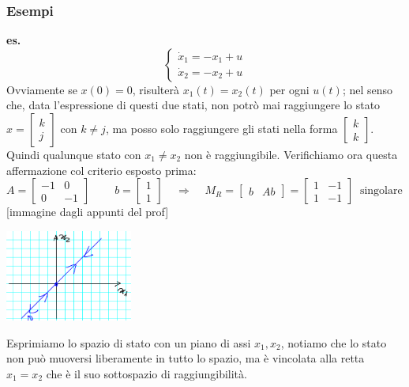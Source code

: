 \subsubsection{Esempi}
\textbf{es.} 
\[
    \begin{cases}
        \dot{x}_1 = -x_1 + u\\
        \dot{x}_2 = -x_2 +u
    \end{cases}
\]
Ovviamente se $x(0) = 0$, risulterà $x_1(t) = x_2(t)$ per ogni $u(t)$; nel senso che, data l'espressione di questi due stati, non potrò mai raggiungere lo stato $x = \left[\begin{matrix}
    k\\j
\end{matrix}\right]$ con $k\neq j$, ma posso solo raggiungere gli stati nella forma $\left[\begin{matrix}
    k\\k
\end{matrix}\right]$.\newline
Quindi qualunque stato con $x_1 \neq x_2$ non è raggiungibile. Verifichiamo ora questa affermazione col criterio esposto prima:
\[
    A = \left[\begin{matrix}
        -1 & 0 \\ 0 & -1
    \end{matrix}\right] \;\;\;\;\;\;\;\; b = \left[\begin{matrix}
        1\\1
    \end{matrix}\right] \;\;\;\;\Longrightarrow \;\;\;\;M_R = \left[\begin{matrix}
        b & Ab
    \end{matrix}\right] = \left[\begin{matrix}
        1 &-1 \\1 & -1
    \end{matrix}\right] \;\;\text{singolare}\;
\]
[immagine dagli appunti del prof]
\begin{center}
    \includegraphics[height=3cm]{../lezione10/img1.PNG}
\end{center}

Esprimiamo lo spazio di stato con un piano di assi $x_1, x_2$, notiamo che lo stato non può muoversi liberamente in tutto lo spazio, ma è vincolata alla retta $x_1 = x_2$ che è il suo sottospazio di raggiungibilità.
